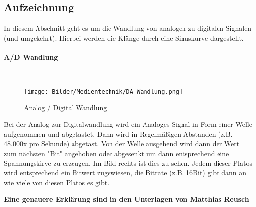 \subsection{Aufzeichnung}

In diesem Abschnitt geht es um die Wandlung von analogen zu digitalen Signalen (und umgekehrt). Hierbei werden die Klänge durch eine Sinuskurve dargestellt.
\paragraph{A/D Wandlung}~
\begin{figure}[h]
    \centering
    \texttt{[image: Bilder/Medientechnik/DA-Wandlung.png]}
    \caption{Analog / Digital Wandlung \cite{DA-Wandlung:online}}
    \label{fig:AD-Wandlung}
\end{figure}

Bei der Analog zur Digitalwandlung wird ein Analoges Signal in Form einer Welle aufgenommen und abgetastet. Dann wird in Regelmäßigen Abstanden (z.B. 48.000x pro Sekunde) abgetast. Von der Welle ausgehend wird dann der Wert zum nächsten "Bit" angehoben oder abgesenkt um dann entsprechend eine Spannungskirve zu erzeugen. Im Bild rechts ist dies zu sehen. Jedem dieser Platos wird entsprechend ein Bitwert zugewiesen, die Bitrate (z.B. 16Bit) gibt dann an wie viele von diesen Platos es gibt. 
\cite{DA-Wandlung:online}

\textbf{Eine genauere Erklärung sind in den Unterlagen von Matthias Reusch}

